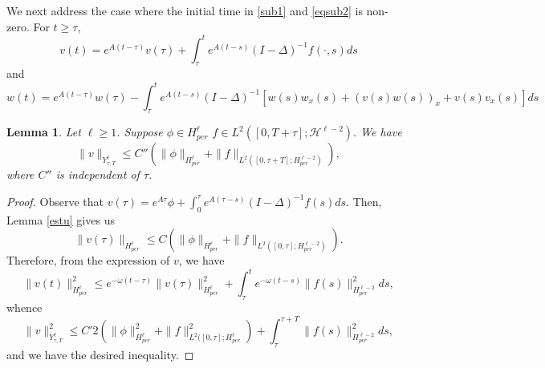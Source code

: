 \documentclass[10pt,a4paper,final]{article}
\numberwithin{equation}{section}
\newtheorem{lemma}[theorem]{Lemma}
\newcommand{\cH}{\mathcal{H}}
\begin{document}
We next address the case where the initial time in \eqref{sub1} and \eqref{eqsub2} is non-zero. For $t\geq \tau$, 
$$v(t)=e^{A(t-\tau)}v(\tau)+\int_\tau^te^{A(t-s)}(I-\Delta)^{-1}f(\cdot,s)ds$$
and 
$$w(t)=e^{A(t-\tau)}w(\tau)-\int_{\tau}^t e^{A(t-s)}(I-\Delta)^{-1}[w(s)w_x(s)+(v(s)w(s))_x+v(s)v_x(s)]ds$$
\begin{lemma}
    Let $\ell\geq 1$. Suppose $\phi\in H^{\ell}_{per}$ $f\in L^{2}([0,T+\tau];\cH^{\ell-2}).$ We have 
    $$\|v\|_{Y^{\ell}_{\tau,T}}\leq C''(\|\phi\|_{ H^{\ell}_{per}}+\|f\|_{L^2([0,\tau+T];H^{\ell-2}_{per})}),$$
    where $C''$ is independent of $\tau$.
\end{lemma}
\begin{proof}
    Observe that $v(\tau)=e^{A\tau}\phi+\int_0^{\tau}e^{A(\tau-s)}(I-\Delta)^{-1}f(s)ds$. Then, Lemma \ref{estu} gives us
    $$\|v(\tau)\|_{H^{\ell}_{per}}\leq C (\|\phi\|_{H^{\ell}_{per}}+\|f\|_{L^2([0,\tau];H^{\ell-2}_{per})}).$$
    Therefore, from the expression of $v$, we have 
    $$\|v(t)\|_{H^{\ell}_{per}}^2\leq e^{-\omega(t-\tau)}\|v(\tau)\|^2_{H^{\ell}_{per}}+\int_\tau^t e^{-\omega(t-s)}\|f(s)\|_{H^{\ell-2}_{per}}^2ds,$$
whence    
    $$\|v\|^2_{Y^{\ell}_{\tau,T}}\leq C' 2(\|\phi\|_{H^{\ell}_{per}}^2+\|f\|_{L^2([0,\tau];H^{\ell}_{per}}^2)+\int_{\tau}^{\tau+T}\|f(s)\|_{H^{\ell-2}_{per}}^2ds,$$
    and we have the desired inequality.
\end{proof}
\end{document}
